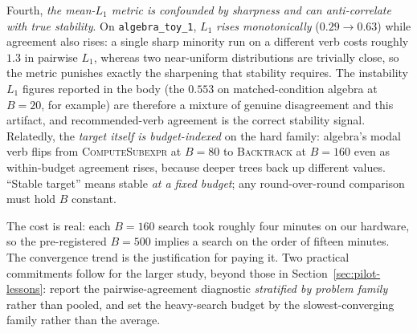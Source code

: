 Fourth, \emph{the mean-$L_1$ metric is confounded by sharpness and can
anti-correlate with true stability}. On \texttt{algebra\_toy\_1},
$L_1$ \emph{rises monotonically} ($0.29 \to 0.63$) while agreement also
rises: a single sharp minority run on a different verb costs roughly
$1.3$ in pairwise $L_1$, whereas two near-uniform distributions are
trivially close, so the metric punishes exactly the sharpening that
stability requires. The instability $L_1$ figures reported in the body
(the $0.553$ on matched-condition algebra at $B = 20$, for
example) are therefore a mixture of genuine disagreement and this
artifact, and recommended-verb agreement is the correct stability
signal. Relatedly, the \emph{target itself is budget-indexed} on the
hard family: algebra's modal verb flips from \textsc{ComputeSubexpr} at
$B = 80$ to \textsc{Backtrack} at $B = 160$ even as within-budget
agreement rises, because deeper trees back up different values.
``Stable target'' means stable \emph{at a fixed budget}; any
round-over-round comparison must hold $B$ constant.

The cost is real: each $B = 160$ search took roughly four minutes on our
hardware, so the pre-registered $B = 500$ implies a search on the order
of fifteen minutes. The convergence trend is the justification for
paying it. Two practical commitments follow for the larger study, beyond
those in Section~\ref{sec:pilot-lessons}: report the pairwise-agreement
diagnostic \emph{stratified by problem family} rather than pooled, and
set the heavy-search budget by the slowest-converging family rather than
the average.
